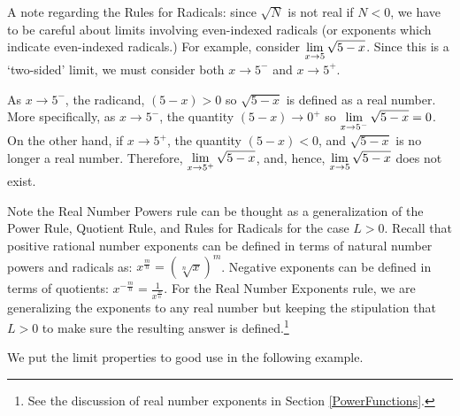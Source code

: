 \documentclass{ximera}
\begin{document}
\medskip

A note regarding the Rules for Radicals:  since $\sqrt{N}$ is not real  if $N<0$, we have to be careful about limits involving even-indexed radicals (or exponents which indicate even-indexed radicals.)   For example, consider $\ds{\lim_{x \rightarrow 5} \sqrt{5-x}}$.  Since this is a `two-sided' limit, we must consider both $x \rightarrow 5^{-}$ and $x \rightarrow 5^{+}$.

\medskip

As $x \rightarrow 5^{-}$, the radicand, $(5-x) >0$ so $\sqrt{5-x}$ is defined as a real number.  More specifically, as $x \rightarrow 5^{-}$, the quantity $(5-x) \rightarrow 0^{+}$ so $\ds{\lim_{x \rightarrow 5^{-}} \sqrt{5-x} = 0}$.  On the other hand, if $x \rightarrow 5^{+}$, the quantity $(5-x) < 0$, and $\sqrt{5-x}$ is no longer a real number.  Therefore, $\ds{\lim_{x \rightarrow 5^{+}} \sqrt{5-x}}$, and, hence, $\ds{\lim_{x \rightarrow 5} \sqrt{5-x}}$ does not exist.

\medskip

Note the Real Number Powers rule can be thought as a generalization of the Power Rule, Quotient Rule, and  Rules for Radicals for the case $L>0$. Recall that positive rational number exponents can be defined in terms of natural number powers and radicals as:  $x^{\frac{m}{n}} = \left( \sqrt[n]{x}\right)^{m}$.  Negative exponents can be defined in terms of quotients:  $x^{-\frac{m}{n}} = \frac{1}{x^{\frac{m}{n}}}$.  For the Real Number Exponents rule, we are generalizing the exponents to any real number but keeping the stipulation that $L>0$ to make sure the resulting answer is defined.\footnote{See the discussion of real number exponents in  Section \ref{PowerFunctions}.}

\medskip

We put the limit properties to good use in the following example.

\pagebreak
\end{document}

